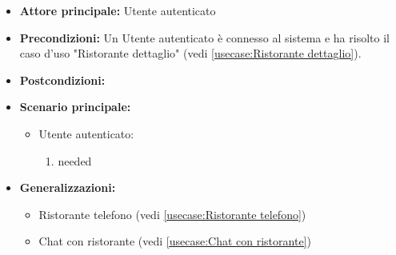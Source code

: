 \label{usecase:Ristorante contatta}
\begin{itemize}
\item \textbf{Attore principale:} Utente autenticato
\item \textbf{Precondizioni:}
Un Utente autenticato è connesso al sistema e ha risolto il caso d'uso "Ristorante dettaglio" (vedi \autoref{usecase:Ristorante dettaglio}).
\item \textbf{Postcondizioni:}
\item \textbf{Scenario principale:}
\begin{itemize}
\item Utente autenticato:
\begin{enumerate}
\item needed
\end{enumerate}
\end{itemize}
\item \textbf{Generalizzazioni:}
\begin{itemize}
\item Ristorante telefono (vedi \autoref{usecase:Ristorante telefono})\item Chat con ristorante (vedi \autoref{usecase:Chat con ristorante})
\end{itemize}
\end{itemize}